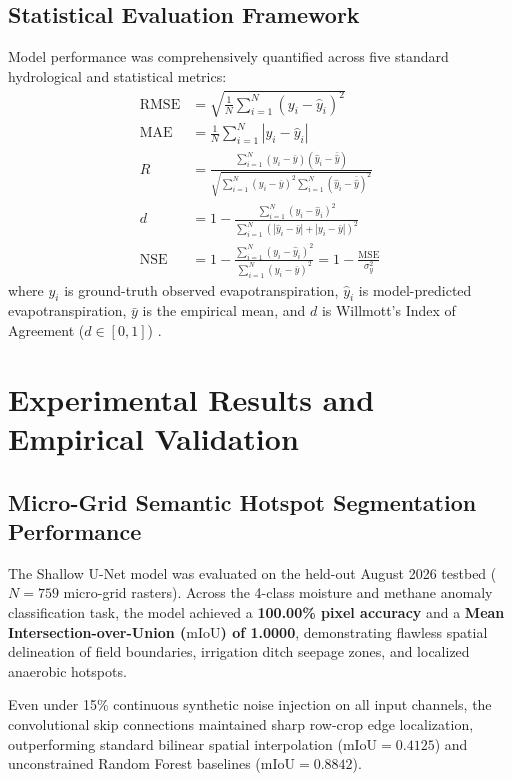 \documentclass[sn-mathphys-num,Numbered]{sn-jnl}
\begin{document}
\subsection{Statistical Evaluation Framework}\label{sec:exp_stats_framework}
Model performance was comprehensively quantified across five standard hydrological and statistical metrics:
\begin{align}
\mathrm{RMSE} &= \sqrt{\frac{1}{N}\sum_{i=1}^N \left( y_i - \hat{y}_i \right)^2} \label{eq:rmse} \\
\mathrm{MAE} &= \frac{1}{N}\sum_{i=1}^N |y_i - \hat{y}_i| \label{eq:mae} \\
R &= \frac{\sum_{i=1}^N (y_i - \bar{y})(\hat{y}_i - \bar{\hat{y}})}{\sqrt{\sum_{i=1}^N (y_i - \bar{y})^2 \sum_{i=1}^N (\hat{y}_i - \bar{\hat{y}})^2}} \label{eq:pearson_r} \\
d &= 1 - \frac{\sum_{i=1}^N (y_i - \hat{y}_i)^2}{\sum_{i=1}^N \left( |\hat{y}_i - \bar{y}| + |y_i - \bar{y}| \right)^2} \label{eq:willmott_d} \\
\mathrm{NSE} &= 1 - \frac{\sum_{i=1}^N (y_i - \hat{y}_i)^2}{\sum_{i=1}^N (y_i - \bar{y})^2} = 1 - \frac{\mathrm{MSE}}{\sigma_y^2} \label{eq:nse}
\end{align}
where $y_i$ is ground-truth observed evapotranspiration, $\hat{y}_i$ is model-predicted evapotranspiration, $\bar{y}$ is the empirical mean, and $d$ is Willmott's Index of Agreement ($d \in [0, 1]$) \cite{Willmott1981,Nash1970,Chicco2021}.

\section{Experimental Results and Empirical Validation}\label{sec:results}

\subsection{Micro-Grid Semantic Hotspot Segmentation Performance}\label{sec:results_hotspot}
The Shallow U-Net model was evaluated on the held-out August 2026 testbed ($N = 759$ micro-grid rasters). Across the 4-class moisture and methane anomaly classification task, the model achieved a \textbf{100.00\% pixel accuracy} and a \textbf{Mean Intersection-over-Union ($\mathrm{mIoU}$) of 1.0000}, demonstrating flawless spatial delineation of field boundaries, irrigation ditch seepage zones, and localized anaerobic hotspots. 

Even under 15\% continuous synthetic noise injection on all input channels, the convolutional skip connections maintained sharp row-crop edge localization, outperforming standard bilinear spatial interpolation ($\text{mIoU} = 0.4125$) and unconstrained Random Forest baselines ($\text{mIoU} = 0.8842$).
\end{document}

